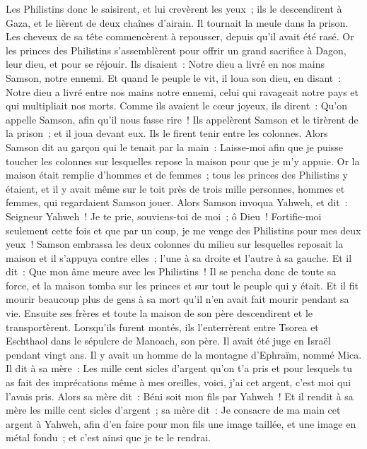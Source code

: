 \begin{multicols}{2}
Les Philistins donc le saisirent, et lui crevèrent les yeux~; ils le descendirent à Gaza, et le lièrent de deux chaînes d'airain. Il tournait la meule dans la prison.
Les cheveux de sa tête commencèrent à repousser, depuis qu'il avait été rasé.
Or les princes des Philistins s'assemblèrent pour offrir un grand sacrifice à Dagon, leur dieu, et pour se réjouir. Ils disaient~: Notre dieu a livré en nos mains Samson, notre ennemi.
Et quand le peuple le vit, il loua son dieu, en disant~: Notre dieu a livré entre nos mains notre ennemi, celui qui ravageait notre pays et qui multipliait nos morts.
Comme ils avaient le cœur joyeux, ils dirent~: Qu'on appelle Samson, afin qu'il nous fasse rire~! Ils appelèrent Samson et le tirèrent de la prison~; et il joua devant eux. Ils le firent tenir entre les colonnes.
Alors Samson dit au garçon qui le tenait par la main~: Laisse-moi afin que je puisse toucher les colonnes sur lesquelles repose la maison pour que je m'y appuie.
Or la maison était remplie d'hommes et de femmes~; tous les princes des Philistins y étaient, et il y avait même sur le toit près de trois mille personnes, hommes et femmes, qui regardaient Samson jouer.
Alors Samson invoqua Yahweh, et dit~: Seigneur Yahweh~! Je te prie, souviens-toi de moi~; ô Dieu~! Fortifie-moi seulement cette fois et que par un coup, je me venge des Philistins pour mes deux yeux~!
Samson embrassa les deux colonnes du milieu sur lesquelles reposait la maison et il s'appuya contre elles~; l'une à sa droite et l'autre à sa gauche.
Et il dit~: Que mon âme meure avec les Philistins~! Il se pencha donc de toute sa force, et la maison tomba sur les princes et sur tout le peuple qui y était. Et il fit mourir beaucoup plus de gens à sa mort qu'il n'en avait fait mourir pendant sa vie.
Ensuite ses frères et toute la maison de son père descendirent et le transportèrent. Lorsqu'ils furent montés, ils l'enterrèrent entre Tsorea et Eschthaol dans le sépulcre de Manoach, son père. Il avait été juge en Israël pendant vingt ans.
\VerseOne{}Il y avait un homme de la montagne d'Ephraïm, nommé Mica.
Il dit à sa mère~: Les mille cent sicles d'argent qu'on t'a pris et pour lesquels tu as fait des imprécations même à mes oreilles, voici, j'ai cet argent, c'est moi qui l'avais pris. Alors sa mère dit~: Béni soit mon fils par Yahweh~!
Et il rendit à sa mère les mille cent sicles d'argent~; sa mère dit~: Je consacre de ma main cet argent à Yahweh, afin d'en faire pour mon fils une image taillée, et une image en métal fondu~; et c'est ainsi que je te le rendrai.

\end{multicols}
